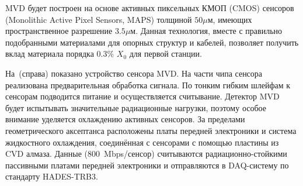 MVD будет построен на основе активных пиксельных КМОП (CMOS) сенсоров (Monolithic Active Pixel Sensors, MAPS) толщиной $50 \mu$м, имеющих пространственное разрешение $3.5 \mu$м. Данная технология, вместе с правильно подобранными материалами для опорных структур и кабелей, позволяет получить вклад материала порядка 0.3\% $X_{0}$ для первой станции.




На~(справа) показано устройство сенсора MVD.
На части чипа сенсора реализована предварительная обработка сигнала.
По тонким гибким шлейфам к сенсорам подводится питание и осуществляется считывание.
Детектор MVD будет испытывать значительные радиационные нагрузки, поэтому особое внимание уделяется охлаждению активных сенсоров. 
За пределами геометрического аксептанса расположены платы передней электроники и система жидкостного охлаждения, соединённая с сенсорами с помощью пластины из CVD алмаза.
Данные (800~Mbps/сенсор) считываются радиационно-стойкими пассивными платами передней электроники и отправляются в DAQ-систему по стандарту HADES-TRB3.

